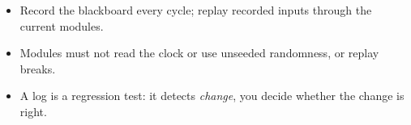 \begin{keyidea}
\begin{itemize}[nosep]
  \item Record the blackboard every cycle; replay recorded inputs through the current modules.
  \item Modules must not read the clock or use unseeded randomness, or replay breaks.
  \item A log is a regression test: it detects \emph{change}, you decide whether the change is right.
\end{itemize}
\end{keyidea}

